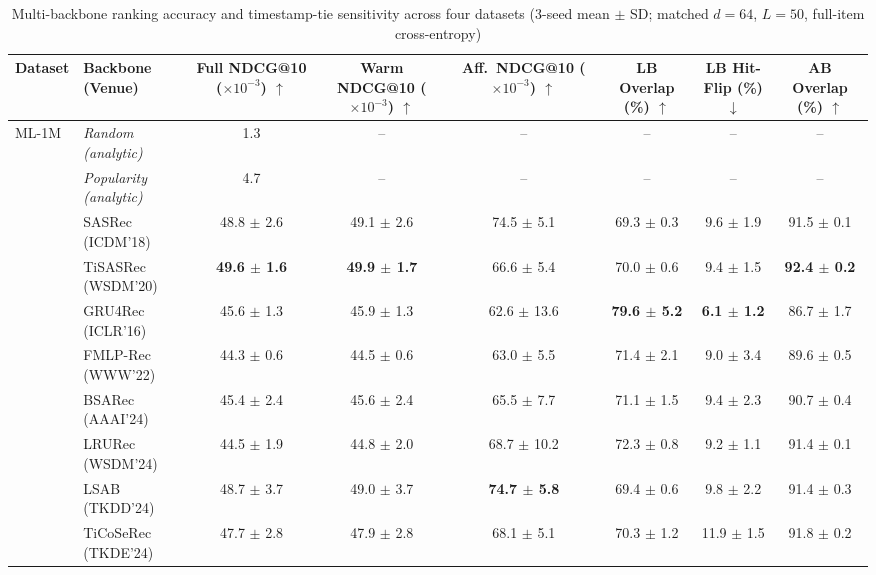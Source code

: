\begin{table}[!htbp]
\centering
\caption{Multi-backbone ranking accuracy and timestamp-tie sensitivity across four datasets (3-seed mean $\pm$ SD; matched $d{=}64$, $L{=}50$, full-item cross-entropy)}
\label{tab:multi-backbone}
\fontsize{8}{10}\selectfont
\setlength{\tabcolsep}{3.2pt}
\renewcommand{\arraystretch}{1.10}
\noindent\begin{tabular*}{\textwidth}{@{\extracolsep{\fill}}llcccccc@{}}
\toprule
Dataset & Backbone (Venue) & \shortstack{Full NDCG@10\\($\times10^{-3}$) $\uparrow$} & \shortstack{Warm NDCG@10\\($\times10^{-3}$) $\uparrow$} & \shortstack{Aff.\ NDCG@10\\($\times10^{-3}$) $\uparrow$} & \shortstack{LB Overlap\\(\%) $\uparrow$} & \shortstack{LB Hit-Flip\\(\%) $\downarrow$} & \shortstack{AB Overlap\\(\%) $\uparrow$} \\
\midrule
ML-1M & \textit{Random (analytic)} & 1.3 & -- & -- & -- & -- & -- \\
 & \textit{Popularity (analytic)} & 4.7 & -- & -- & -- & -- & -- \\
 & SASRec (ICDM'18) & 48.8 $\pm$ 2.6 & 49.1 $\pm$ 2.6 & 74.5 $\pm$ 5.1 & 69.3 $\pm$ 0.3 & 9.6 $\pm$ 1.9 & 91.5 $\pm$ 0.1 \\
 & TiSASRec (WSDM'20) & \textbf{49.6 $\pm$ 1.6} & \textbf{49.9 $\pm$ 1.7} & 66.6 $\pm$ 5.4 & 70.0 $\pm$ 0.6 & 9.4 $\pm$ 1.5 & \textbf{92.4 $\pm$ 0.2} \\
 & GRU4Rec (ICLR'16) & 45.6 $\pm$ 1.3 & 45.9 $\pm$ 1.3 & 62.6 $\pm$ 13.6 & \textbf{79.6 $\pm$ 5.2} & \textbf{6.1 $\pm$ 1.2} & 86.7 $\pm$ 1.7 \\
 & FMLP-Rec (WWW'22) & 44.3 $\pm$ 0.6 & 44.5 $\pm$ 0.6 & 63.0 $\pm$ 5.5 & 71.4 $\pm$ 2.1 & 9.0 $\pm$ 3.4 & 89.6 $\pm$ 0.5 \\
 & BSARec (AAAI'24) & 45.4 $\pm$ 2.4 & 45.6 $\pm$ 2.4 & 65.5 $\pm$ 7.7 & 71.1 $\pm$ 1.5 & 9.4 $\pm$ 2.3 & 90.7 $\pm$ 0.4 \\
 & LRURec (WSDM'24) & 44.5 $\pm$ 1.9 & 44.8 $\pm$ 2.0 & 68.7 $\pm$ 10.2 & 72.3 $\pm$ 0.8 & 9.2 $\pm$ 1.1 & 91.4 $\pm$ 0.1 \\
 & LSAB (TKDD'24) & 48.7 $\pm$ 3.7 & 49.0 $\pm$ 3.7 & \textbf{74.7 $\pm$ 5.8} & 69.4 $\pm$ 0.6 & 9.8 $\pm$ 2.2 & 91.4 $\pm$ 0.3 \\
 & TiCoSeRec (TKDE'24) & 47.7 $\pm$ 2.8 & 47.9 $\pm$ 2.8 & 68.1 $\pm$ 5.1 & 70.3 $\pm$ 1.2 & 11.9 $\pm$ 1.5 & 91.8 $\pm$ 0.2 \\

\end{tabular*}
\end{table}
